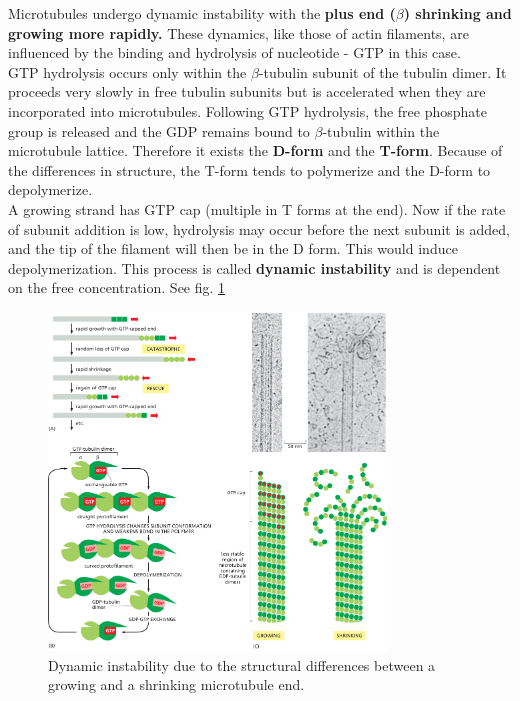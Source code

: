 \documentclass[../main.tex]{subfiles}
\begin{document}
Microtubules undergo dynamic instability with the \textbf{plus end ($\beta$) shrinking and growing more rapidly.} These dynamics, like those of actin filaments, are influenced by the binding and hydrolysis of nucleotide - GTP in this case. \\
\indent GTP hydrolysis occurs only within the $\beta$-tubulin subunit of the tubulin dimer. It proceeds very slowly in free tubulin subunits but is accelerated when they are incorporated into microtubules. Following GTP hydrolysis, the free phosphate group is released and 
the GDP remains bound to $\beta$-tubulin within the microtubule lattice. Therefore it exists the \textbf{D-form} and the \textbf{T-form}. Because of the differences in structure, the T-form tends to polymerize and the D-form to depolymerize. \\
\indent A growing strand has GTP cap (multiple in T forms at the end). Now if the rate of subunit addition is low, hydrolysis may occur before the next subunit is added, and the tip of the filament will then be in the D form. This would induce depolymerization. This process is called \textbf{dynamic instability} and is dependent on the free concentration. See fig. \ref{dynamic-instability}

\begin{figure}[H]
	\centering
	\includegraphics[width = 0.8\textwidth]{22}
	\caption{Dynamic instability due to the structural differences between a growing and a shrinking microtubule end.}
	\label{dynamic-instability}
\end{figure}
\end{document}
